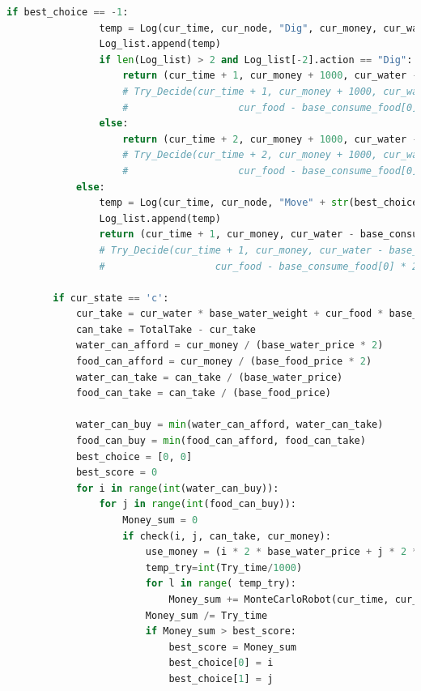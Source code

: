 \documentclass[withoutpreface,bwprint]{cumcmthesis} %
\begin{document}
\begin{appendices}
\begin{lstlisting}[language=python]
            if best_choice == -1:
                temp = Log(cur_time, cur_node, "Dig", cur_money, cur_water, cur_food)
                Log_list.append(temp)
                if len(Log_list) > 2 and Log_list[-2].action == "Dig":
                    return (cur_time + 1, cur_money + 1000, cur_water - base_consume_water[0] * 4,cur_food - base_consume_food[0] * 4, cur_node)
                    # Try_Decide(cur_time + 1, cur_money + 1000, cur_water - base_consume_water[0] * 4,
                    #                   cur_food - base_consume_food[0] * 4, cur_node, Log_list)
                else:
                    return (cur_time + 2, cur_money + 1000, cur_water - base_consume_water[0] * 4,cur_food - base_consume_food[0] * 4, cur_node)
                    # Try_Decide(cur_time + 2, cur_money + 1000, cur_water - base_consume_water[0] * 4,
                    #                   cur_food - base_consume_food[0] * 4, cur_node, Log_list)
            else:
                temp = Log(cur_time, cur_node, "Move" + str(best_choice), cur_money, cur_water, cur_food)
                Log_list.append(temp)
                return (cur_time + 1, cur_money, cur_water - base_consume_water[0] * 2, cur_food - base_consume_food[0] * 2, best_choice)
                # Try_Decide(cur_time + 1, cur_money, cur_water - base_consume_water[0] * 2,
                #                   cur_food - base_consume_food[0] * 2, best_choice, Log_list)
    
        if cur_state == 'c':
            cur_take = cur_water * base_water_weight + cur_food * base_food_weight
            can_take = TotalTake - cur_take
            water_can_afford = cur_money / (base_water_price * 2)
            food_can_afford = cur_money / (base_food_price * 2)
            water_can_take = can_take / (base_water_price)
            food_can_take = can_take / (base_food_price)
    
            water_can_buy = min(water_can_afford, water_can_take)
            food_can_buy = min(food_can_afford, food_can_take)
            best_choice = [0, 0]
            best_score = 0
            for i in range(int(water_can_buy)):
                for j in range(int(food_can_buy)):
                    Money_sum = 0
                    if check(i, j, can_take, cur_money):
                        use_money = (i * 2 * base_water_price + j * 2 * base_food_price)
                        temp_try=int(Try_time/1000)
                        for l in range( temp_try):
                            Money_sum += MonteCarloRobot(cur_time, cur_money - use_money, cur_water, cur_food, cur_node)
                        Money_sum /= Try_time
                        if Money_sum > best_score:
                            best_score = Money_sum
                            best_choice[0] = i
                            best_choice[1] = j
    

\end{lstlisting}
\end{appendices}
\end{document}

